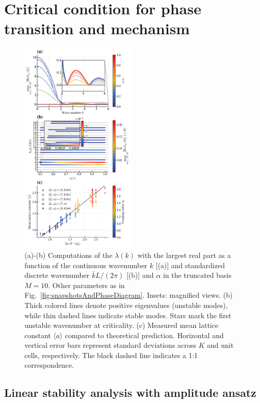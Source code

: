 \documentclass{article}
\begin{document}
\newpage
\section{Critical condition for phase transition and mechanism}

\begin{figure}
    \centering
    \includegraphics[width=0.49\textwidth]{./figs/eigenvaluesAndLatticeConstants.pdf}
    \caption{
        \label{fig:eigenvaluesAndLatticeConstants}
        (a)-(b) Computations of the $\lambda(k)$ with the largest real part as a function of the continuous wavenumber $k$ [(a)] and standardized discrete wavenumber $\bar{k}L/(2\pi)$ [(b)] and $\alpha$ in the truncated basis $M=10$. Other parameters as in Fig.~\ref{fig:snapshotsAndPhaseDiagram}. Insets: magnified views.
        (b) Thick colored lines denote positive eigenvalues (unstable modes), while thin dashed lines indicate stable modes. Stars mark the first unstable wavenumber at criticality. (c) Measured mean lattice constant $\langle a \rangle$ compared to theoretical prediction. Horizontal and vertical error bars represent standard deviations across $K$ and unit cells, respectively. The black dashed line indicates a 1:1 correspondence.
    }
\end{figure}

\subsection{Linear stability analysis with amplitude ansatz}
\end{document}
